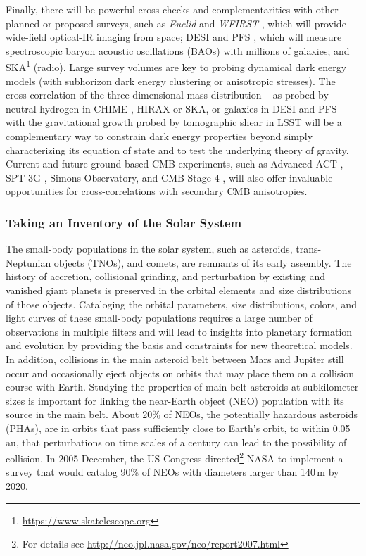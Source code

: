 Finally, there will be powerful cross-checks and complementarities with other planned or
proposed surveys, such as \textit{Euclid} \citep{2011arXiv1110.3193L} and \textit{WFIRST}
\citep{2015arXiv150303757S}, which will provide
wide-field optical-IR imaging from space;
DESI \citep{2013arXiv1308.0847L}
and PFS \citep{2014PASJ...66R...1T}, which will measure
spectroscopic baryon acoustic oscillations (BAOs) with
millions of galaxies; and SKA\footnote{\url{https://www.skatelescope.org}} (radio).
Large survey volumes are key to probing dynamical dark energy models (with subhorizon
dark energy clustering or anisotropic stresses). The cross-correlation
of the three-dimensional
mass distribution -- as probed by neutral hydrogen in CHIME \citep{2014SPIE.9145E..4VN}, HIRAX \citep{2016SPIE.9906E..5XN}
or SKA, or galaxies in DESI and PFS -- with the gravitational growth
probed by tomographic shear in LSST will be a complementary way to constrain dark energy
properties beyond simply characterizing its equation of state and to test the underlying theory of gravity.
Current and future ground-based CMB experiments, such as Advanced ACT \citep{2016SPIE.9910E..14D},
SPT-3G \citep{2014SPIE.9153E..1PB}, Simons Observatory, and CMB Stage-4 \citep{2016arXiv161002743A}, will also offer invaluable opportunities for
cross-correlations with secondary CMB anisotropies.



\subsubsection{Taking an Inventory of the Solar System}


The small-body populations in the solar system, such as asteroids, trans-Neptunian objects (TNOs),
and comets, are remnants of its early assembly. The history of accretion, collisional grinding, and
perturbation by existing and vanished giant planets is preserved in the orbital elements and size
distributions of those objects. Cataloging the orbital parameters, size distributions, colors, and light
curves of these small-body populations requires a large number of observations in multiple filters
and will lead to insights into planetary formation and evolution by providing the basis and constraints
for new theoretical models. In addition, collisions in the main asteroid belt between Mars and Jupiter
still occur and occasionally eject objects on orbits that may place them on a collision course with Earth.
Studying the properties of main belt asteroids at subkilometer sizes is important for linking the near-Earth
object (NEO) population with its source in the main belt. About 20\% of NEOs, the potentially hazardous
asteroids (PHAs), are in orbits that pass sufficiently close to Earth's orbit, to within 0.05\,au, that perturbations
on time scales of a century can lead to the possibility of collision. In 2005 December,
the US Congress directed\footnote{For details see \url{http://neo.jpl.nasa.gov/neo/report2007.html}} NASA to
implement a survey that would catalog 90\% of NEOs with diameters larger than 140\,m by 2020.

